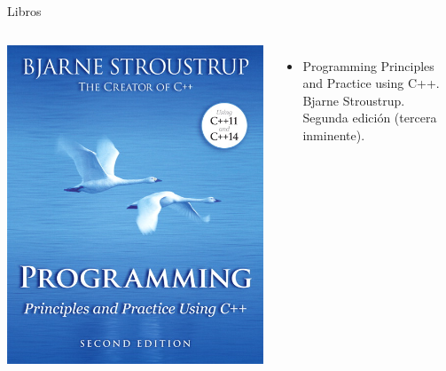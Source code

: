 \begin{frame}[t]{Libros}
\begin{columns}
\includegraphics[height=.3\textheight]{img/ppp-2e.jpg}
\begin{itemize}
\item Programming Principles and Practice using C++.\\
      Bjarne Stroustrup.\\
      Segunda edición (tercera inminente).
\end{itemize}
\end{columns}

\vfill


\end{frame}
